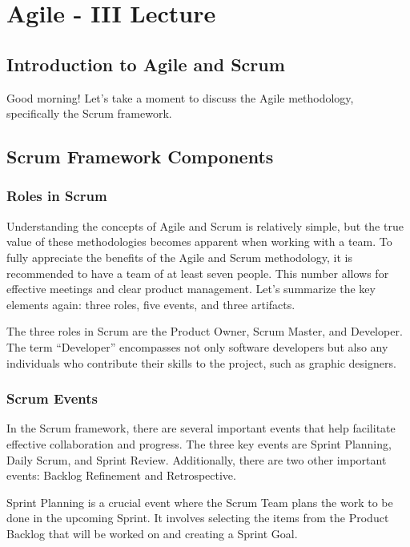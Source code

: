 \section{Agile - III Lecture}

\subsection{Introduction to Agile and Scrum}

Good morning! Let's take a moment to discuss the Agile methodology,
specifically the Scrum framework.

\subsection{Scrum Framework Components}

\subsubsection{Roles in Scrum}

Understanding the concepts of Agile and Scrum is relatively simple, but
the true value of these methodologies becomes apparent when working with
a team. To fully appreciate the benefits of the Agile and Scrum methodology, it
is recommended to have a team of at least seven people. This number
allows for effective meetings and clear product management. Let's
summarize the key elements again: three roles, five events, and three
artifacts.

The three roles in Scrum are the Product Owner, Scrum Master, and
Developer. The term ``Developer'' encompasses not only software
developers but also any individuals who contribute their skills to the
project, such as graphic designers.

\subsubsection{Scrum Events}

In the Scrum framework, there are several important events that help
facilitate effective collaboration and progress. The three key events
are Sprint Planning, Daily Scrum, and Sprint Review. Additionally, there
are two other important events: Backlog Refinement and Retrospective.

Sprint Planning is a crucial event where the Scrum Team plans the work
to be done in the upcoming Sprint. It involves selecting the items from
the Product Backlog that will be worked on and creating a Sprint Goal.

